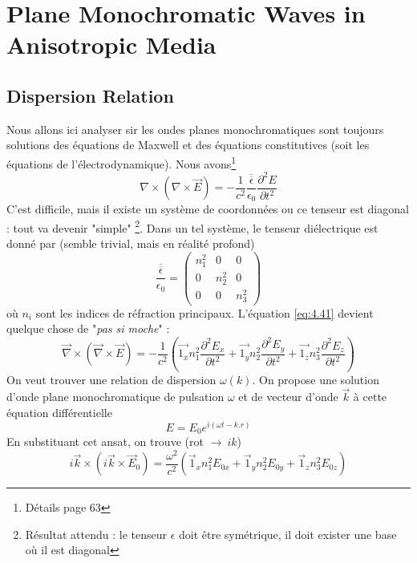 \section{Plane Monochromatic Waves in Anisotropic Media}
\subsection{Dispersion Relation}
Nous allons ici analyser sir les ondes planes monochromatiques sont toujours solutions des équations de 
Maxwell et des équations constitutives (soit les équations de l’électrodynamique). Nous avons\footnote{Détails
page 63}
\begin{equation}
\nabla\times\left(\nabla\times\vec{E}\right) = -\frac{1}{c^2}\dfrac{\overline{\overline{\epsilon}}}{\epsilon_0}
\frac{\partial^2E}{\partial t^2}
\label{eq:4.41}
\end{equation}
C'est difficile, mais il existe un système de coordonnées ou ce tenseur est diagonal : tout va devenir "simple"
\footnote{Résultat attendu : le tenseur $\epsilon$ doit être symétrique, il doit exister une base où il est
diagonal}. Dans un tel système, le tenseur diélectrique est donné par (semble trivial, mais en réalité profond)
\begin{equation}
\dfrac{\overline{\overline{\epsilon}}}{\epsilon_0} =\left(\begin{array}{ccc}
n_1^2 & 0 &0\\
0 &n_2^2 &0\\
0&0&n_3^2
\end{array}\right)
\end{equation}
où $n_i$ sont les indices de réfraction principaux. L'équation \eqref{eq:4.41} devient quelque chose de 
"\textit{pas si moche}" : 
\begin{equation}
\vec\nabla\times(\vec\nabla\times\vec E) = -\frac{1}{c^2}\left(\vec{1_x} n_1^2\dfrac{\partial^2 E_x}{\partial t^2}
+\vec{1_y} n_2^2\dfrac{\partial^2 E_y}{\partial t^2}+\vec{1_z} n_3^2\dfrac{\partial^2 E_z}{\partial t^2}\right)
\end{equation}
On veut trouver une relation de dispersion $\omega(k)$. On propose une solution d'onde plane monochromatique 
de pulsation $\omega$ et de vecteur d'onde $\vec{k}$ à cette équation différentielle
\begin{equation}
E = E_0e^{i(\omega t-k.r)}
\end{equation}
En substituant cet ansat, on trouve (rot $\to\ ik$)
\begin{equation}
i\vec k\times(i\vec k\times \vec E_0) = \frac{\omega^2}{c^2}\left(\vec 1_x n_1^ 2 E_{0x}+
\vec 1_y n_2^ 2 E_{0y}+\vec 1_z n_3^ 2 E_{0z}\right)
\end{equation}
